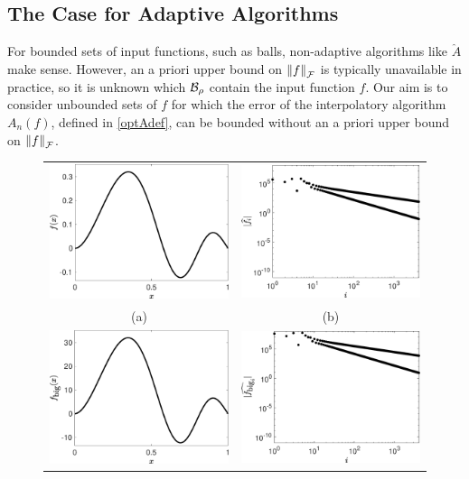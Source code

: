 \documentclass[graybox,footinfo]{svmult}
\newcommand{\DHJRnorm}[2][{}]{\ensuremath{\left \lVert #2 \right \rVert}_{#1}}
\begin{document}
\subsection{The Case for Adaptive Algorithms}
For bounded sets of input functions, such as balls, non-adaptive algorithms like $\widehat{A}$ make sense.  However, an a priori upper bound on $\DHJRnorm[\calF]{f}$ is typically unavailable in practice, so it is unknown which $\calB_{\rho}$ contain the input function $f$.  Our aim is to consider unbounded sets of $f$ for which the error of the interpolatory algorithm $A_n(f)$, defined in \eqref{optAdef}, can be bounded without an a priori upper bound on $\DHJRnorm[\calF]{f}$.


\begin{figure}[ht]
	\centering
	\begin{tabular}{cc}
		\includegraphics[width=5.5cm]{ProgramsImages/Function.eps} &
		\includegraphics[width=5.5cm]{ProgramsImages/FunctionWalshFourierCoeffDecay.eps}
		\\ (a) & (b) \\
		\includegraphics[width =5.5cm]{ProgramsImages/Scaled.eps} &
		\includegraphics[width=5.5cm]{ProgramsImages/ScaledWalshFourierCoeffDecay.eps}

\end{tabular}
\end{figure}
\end{document}
